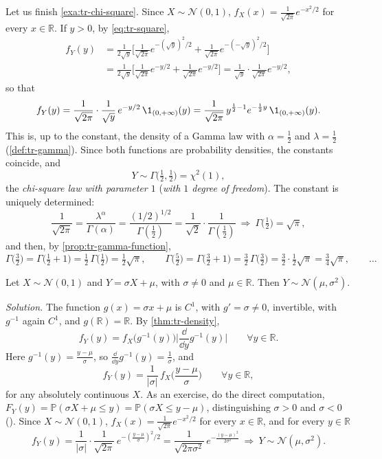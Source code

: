 \begin{example}\label{exa:tr-chi-square-end}
Let us finish \cref{exa:tr-chi-square}. Since $X\sim\mathcal N(0,1)$,
$f_X(x)=\frac1{\sqrt{2\pi}}e^{-x^2/2}$ for every $x\in\mathbb R$. If $y>0$, by \eqref{eq:tr-square},
\[
\begin{aligned}
  f_Y(y)&=\frac1{2\sqrt y}\Big[\frac1{\sqrt{2\pi}}e^{-(\sqrt y)^2/2}+\frac1{\sqrt{2\pi}}e^{-(-\sqrt y)^2/2}\Big]\\
  &=\frac1{2\sqrt y}\Big[\frac1{\sqrt{2\pi}}e^{-y/2}+\frac1{\sqrt{2\pi}}e^{-y/2}\Big]
  =\frac1{\sqrt y}\cdot\frac1{\sqrt{2\pi}}e^{-y/2},
\end{aligned}
\]
so that
\[
  f_Y(y)=\frac1{\sqrt{2\pi}}\cdot\frac1{\sqrt y}\,e^{-y/2}\,\1_{(0,+\infty)}(y)
  =\frac1{\sqrt{2\pi}}\,y^{\frac12-1}e^{-\frac12y}\,\1_{(0,+\infty)}(y).
\]
This is, up to the constant, the density of a Gamma law with $\alpha=\frac12$ and $\lambda=\frac12$
(\cref{def:tr-gamma}). Since both functions are probability densities, the constants coincide, and
\[
  Y\sim\Gamma\big(\tfrac12,\tfrac12\big)=\chi^2(1),
\]
the \emph{chi-square law with parameter $1$} (\emph{with $1$ degree of freedom}). The constant is
uniquely determined:
\[
  \frac1{\sqrt{2\pi}}=\frac{\lambda^\alpha}{\Gamma(\alpha)}=\frac{(1/2)^{1/2}}{\Gamma(\frac12)}
  =\frac1{\sqrt2}\cdot\frac1{\Gamma(\frac12)}\ \Longrightarrow\ \Gamma\big(\tfrac12\big)=\sqrt\pi ,
\]
and then, by \cref{prop:tr-gamma-function},
\[
  \Gamma\big(\tfrac32\big)=\Gamma\big(\tfrac12+1\big)=\tfrac12\,\Gamma\big(\tfrac12\big)=\tfrac12\sqrt\pi,\qquad
  \Gamma\big(\tfrac52\big)=\Gamma\big(\tfrac32+1\big)=\tfrac32\,\Gamma\big(\tfrac32\big)=\tfrac32\cdot\tfrac12\sqrt\pi=\tfrac34\sqrt\pi,
  \qquad\dots
\]
\end{example}

\begin{example}\label{prop:tr-affine-gaussian}
Let $X\sim\mathcal N(0,1)$ and $Y=\sigma X+\mu$, with $\sigma\ne0$ and $\mu\in\mathbb R$. Then
$Y\sim\mathcal N(\mu,\sigma^2)$.

\emph{Solution.} The function $g(x)=\sigma x+\mu$ is $C^1$, with $g'=\sigma\ne0$, invertible, with
$g^{-1}$ again $C^1$, and $g(\mathbb R)=\mathbb R$. By \cref{thm:tr-density},
\[
  f_Y(y)=f_X\big(g^{-1}(y)\big)\Big|\frac{\dd}{\dd y}g^{-1}(y)\Big|\qquad\forall y\in\mathbb R .
\]
Here $g^{-1}(y)=\frac{y-\mu}\sigma$, so $\frac{\dd}{\dd y}g^{-1}(y)=\frac1\sigma$, and
\[
  f_Y(y)=\frac1{|\sigma|}\,f_X\Big(\frac{y-\mu}\sigma\Big)\qquad\forall y\in\mathbb R ,
\]
for any absolutely continuous $X$. As an exercise, do the direct computation,
$F_Y(y)=\mathbb P(\sigma X+\mu\le y)=\mathbb P(\sigma X\le y-\mu)$, distinguishing $\sigma>0$ and
$\sigma<0$ (). Since $X\sim\mathcal N(0,1)$,
$f_X(x)=\frac1{\sqrt{2\pi}}e^{-x^2/2}$ for every $x\in\mathbb R$, and for every $y\in\mathbb R$
\[
  f_Y(y)=\frac1{|\sigma|}\cdot\frac1{\sqrt{2\pi}}\,e^{-\left(\frac{y-\mu}\sigma\right)^2/2}
  =\frac1{\sqrt{2\pi\sigma^2}}\,e^{-\frac{(y-\mu)^2}{2\sigma^2}}
  \ \Longrightarrow\ Y\sim\mathcal N(\mu,\sigma^2).
\]
\end{example}

